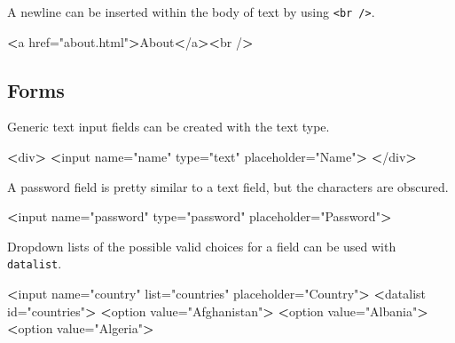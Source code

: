 \documentclass[]{book}
\newenvironment{Shaded}{\begin{snugshade}}{\end{snugshade}}
\newcommand{\ExtensionTok}[1]{#1}
\newcommand{\NormalTok}[1]{#1}
\newcommand{\OperatorTok}[1]{\textcolor[rgb]{0.81,0.36,0.00}{\textbf{#1}}}
\newcommand{\StringTok}[1]{\textcolor[rgb]{0.31,0.60,0.02}{#1}}
\begin{document}
A newline can be inserted within the body of text by using \texttt{\textless{}br\ /\textgreater{}}.

\begin{Shaded}
\begin{Highlighting}[]
\OperatorTok{<}\ExtensionTok{a}\NormalTok{ href=}\StringTok{"about.html"}\OperatorTok{>}\NormalTok{About}\OperatorTok{<}\NormalTok{/a}\OperatorTok{><}\NormalTok{br /}\OperatorTok{>}
\end{Highlighting}
\end{Shaded}

\hypertarget{forms}{%
\subsection{Forms}\label{forms}}

Generic text input fields can be created with the text type.

\begin{Shaded}
\begin{Highlighting}[]
\OperatorTok{<}\ExtensionTok{div}\OperatorTok{>}
\OperatorTok{<}\ExtensionTok{input}\NormalTok{ name=}\StringTok{"name"}\NormalTok{ type=}\StringTok{"text"}\NormalTok{ placeholder=}\StringTok{"Name"}\OperatorTok{>}
\OperatorTok{<}\NormalTok{/}\ExtensionTok{div}\OperatorTok{>}
\end{Highlighting}
\end{Shaded}

A password field is pretty similar to a text field, but the characters are obscured.

\begin{Shaded}
\begin{Highlighting}[]
\OperatorTok{<}\ExtensionTok{input}\NormalTok{ name=}\StringTok{"password"}\NormalTok{ type=}\StringTok{"password"}\NormalTok{ placeholder=}\StringTok{"Password"}\OperatorTok{>}
\end{Highlighting}
\end{Shaded}

Dropdown lists of the possible valid choices for a field can be used with \texttt{datalist}.

\begin{Shaded}
\begin{Highlighting}[]
\OperatorTok{<}\ExtensionTok{input}\NormalTok{ name=}\StringTok{"country"}\NormalTok{ list=}\StringTok{"countries"}\NormalTok{ placeholder=}\StringTok{"Country"}\OperatorTok{>}
\OperatorTok{<}\ExtensionTok{datalist}\NormalTok{ id=}\StringTok{"countries"}\OperatorTok{>}
    \OperatorTok{<}\ExtensionTok{option}\NormalTok{ value=}\StringTok{"Afghanistan"}\OperatorTok{>}
    \OperatorTok{<}\ExtensionTok{option}\NormalTok{ value=}\StringTok{"Albania"}\OperatorTok{>}
    \OperatorTok{<}\ExtensionTok{option}\NormalTok{ value=}\StringTok{"Algeria"}\OperatorTok{>}
\end{Highlighting}
\end{Shaded}
\end{document}
